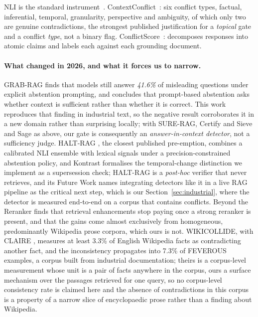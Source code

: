 \documentclass[conference]{IEEEtran}
\begin{document}
NLI is the standard instrument~\cite{williams2018mnli,nie2020anli}.
ContextConflict~\cite{yang2026contextconflict}: six conflict types, factual,
inferential, temporal, granularity, perspective and ambiguity, of which only
two are genuine contradictions, the strongest published justification for a
\emph{topical} gate and a conflict \emph{type}, not a binary flag.
ConflictScore~\cite{liu2026conflictscore}: decomposes responses into atomic
claims and labels each against each grounding document.

\paragraph{What changed in 2026, and what it forces us to narrow.} GRAB-RAG
\cite{setiawan2026grabrag} finds that models still answer \emph{41.6\%} of
misleading questions under explicit abstention prompting, and concludes that
prompt-based abstention asks whether context is sufficient rather than
whether it is correct. This work reproduces that finding in industrial text,
so the negative result corroborates it in a new domain rather than surprising
locally; with SURE-RAG, Certify and Sieve and Sage as above, our gate is
consequently an \emph{answer-in-context detector}, not a sufficiency judge.
HALT-RAG \cite{goswami2025haltrag}, the closest published pre-emption,
combines a calibrated NLI ensemble with lexical signals under a
precision-constrained abstention policy, and Kontrast \cite{wei2026kontrast}
formalises the temporal-change distinction we implement as a supersession
check; HALT-RAG is a \emph{post-hoc} verifier that never retrieves, and its
Future Work names integrating detectors like it in a live RAG pipeline as the
critical next step, which is our Section~\ref{sec:industrial}, where the
detector is measured end-to-end on a corpus that contains conflicts.
Beyond the Reranker
\cite{singh2026beyondreranker} finds that retrieval enhancements stop paying
once a strong reranker is present, and that the gains come almost exclusively
from homogeneous, predominantly Wikipedia prose corpora, which ours is not.
WIKICOLLIDE, with CLAIRE \cite{semnani2025wikicollide}, measures at least
3.3\% of English Wikipedia facts as contradicting another fact, and the
inconsistency propagates into 7.3\% of FEVEROUS examples, a corpus built from
industrial documentation; theirs is a corpus-level measurement whose unit is a
pair of facts anywhere in the corpus, ours a surface mechanism over the
passages retrieved for one query, so no corpus-level consistency rate is
claimed here and the absence of contradictions in this corpus is a property of
a narrow slice of encyclopaedic prose rather than a finding about Wikipedia.
\end{document}
